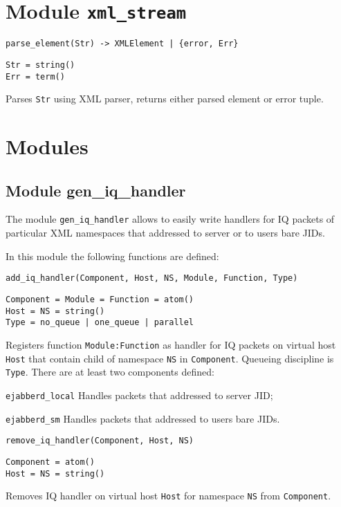 \documentclass[a4paper,10pt]{article}
\begin{document}
\section{Module \texttt{xml\_stream}}
\label{sec:xmlstreammod}

\begin{description}
\item{\verb!parse_element(Str) -> XMLElement | {error, Err}!}
\begin{verbatim}
Str = string()
Err = term()
\end{verbatim}
  Parses \texttt{Str} using XML parser, returns either parsed element or error
  tuple.
\end{description}


\section{Modules}
\label{sec:emods}




\subsection{Module gen\_iq\_handler}
\label{sec:geniqhandl}

The module \verb|gen_iq_handler| allows to easily write handlers for IQ packets
of particular XML namespaces that addressed to server or to users bare JIDs.

In this module the following functions are defined:
\begin{description}
\item{\verb|add_iq_handler(Component, Host, NS, Module, Function, Type)|}
\begin{verbatim}
Component = Module = Function = atom()
Host = NS = string()
Type = no_queue | one_queue | parallel
\end{verbatim}
  Registers function \verb|Module:Function| as handler for IQ packets on
  virtual host \verb|Host| that contain child of namespace \verb|NS| in
  \verb|Component|.  Queueing discipline is \verb|Type|.  There are at least
  two components defined:
  \begin{description}
  \item{\verb|ejabberd_local|} Handles packets that addressed to server JID;
  \item{\verb|ejabberd_sm|} Handles packets that addressed to users bare JIDs.
  \end{description}
\item{\verb|remove_iq_handler(Component, Host, NS)|}
\begin{verbatim}
Component = atom()
Host = NS = string()
\end{verbatim}
  Removes IQ handler on virtual host \verb|Host| for namespace \verb|NS| from
  \verb|Component|.
\end{description}
\end{document}
